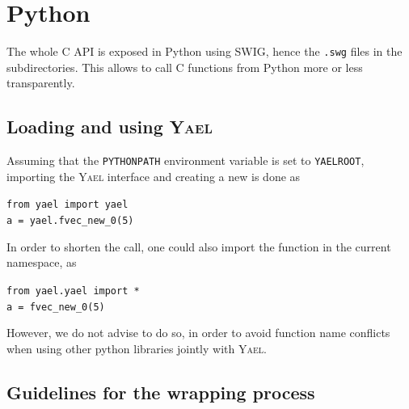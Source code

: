 \documentclass[a4paper,11pt,notitlepage,final,twoside]{report}
\newcommand{\yael}{\textsc{Yael}\xspace}
\newcommand{\yroot}{\texttt{YAELROOT}\xspace}
\newcommand{\tc}[1]{\texttt{#1}}
\newcommand{\code}[1]{\smallskip 

\texttt{#1} 
 \medskip

}
\begin{document}

\chapter{Python}

The whole C API is exposed in Python using SWIG, hence the \tc{.swg} files in the subdirectories. This allows to call C functions from Python more or less transparently. 


\section{Loading and using \yael}

Assuming that the \tc{PYTHONPATH} environment variable is set to \yroot, 
importing the \yael interface and creating a new is done as 
\code{from yael import yael  \\
a = yael.fvec\_new\_0(5)
}

In order to shorten the call, one could also import the function 
in the current namespace, as
\code{from yael.yael import * \\
a = fvec\_new\_0(5)
}

However, we do not advise to do so, in order to avoid function name conflicts 
when using other python libraries jointly with \yael. 

\section{Guidelines for the wrapping process}
\end{document}
